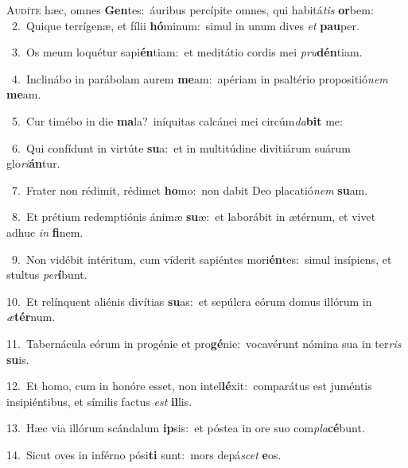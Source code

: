 \lettrine{\initial\textcolor{\initialcolor}{A}}{udíte} hæc, omnes \textbf{Gen}\-tes:~\star áuribus percípite omnes, qui habitá\textit{tis} \textbf{or}\-bem:\\
{\numbfont\textcolor{\numbcolor}{~2.}}~Quique terrígenæ, et fílii \textbf{hó}\-minum:~\star simul in unum dives \textit{et} \textbf{pau}\-per.\par
{\numbfont\textcolor{\numbcolor}{~3.}}~Os meum loquétur sapi\-\textbf{én}\-tiam:~\star et meditátio cordis mei \textit{pru}\-\textbf{dén}tiam.\par
{\numbfont\textcolor{\numbcolor}{~4.}}~Inclinábo in parábolam aurem \textbf{me}\-am:~\star apériam in psaltério propositió\textit{nem} \textbf{me}\-am.\par
{\numbfont\textcolor{\numbcolor}{~5.}}~Cur timébo in die \textbf{ma}\-la?~\star iníquitas calcánei mei circúm\-\textit{da}\-\textbf{bit} me:\par
{\numbfont\textcolor{\numbcolor}{~6.}}~Qui confídunt in virtúte \textbf{su}\-a:~\star et in multitúdine divitiárum suárum glo\-\textit{ri}\-\textbf{án}tur.\par
{\numbfont\textcolor{\numbcolor}{~7.}}~Frater non rédimit, rédimet \textbf{ho}\-mo:~\star non dabit Deo placatió\textit{nem} \textbf{su}\-am.\par
{\numbfont\textcolor{\numbcolor}{~8.}}~Et prétium redemptiónis ánimæ \textbf{su}\-æ:~\star et laborábit in ætérnum, et vivet adhuc \textit{in} \textbf{fi}\-nem.\par
{\numbfont\textcolor{\numbcolor}{~9.}}~Non vidébit intéritum, cum víderit sapiéntes mori\-\textbf{én}\-tes:~\star simul insípiens, et stultus \textit{per}\-\textbf{í}bunt.\par
{\numbfont\textcolor{\numbcolor}{10.}}~Et relínquent aliénis divítias \textbf{su}\-as:~\star et sepúlcra eórum domus illórum in \textit{æ}\-\textbf{tér}num.\par
{\numbfont\textcolor{\numbcolor}{11.}}~Tabernácula eórum in progénie et pro\-\textbf{gé}\-nie:~\star vocavérunt nómina sua in ter\textit{ris} \textbf{su}\-is.\par
{\numbfont\textcolor{\numbcolor}{12.}}~Et homo, cum in honóre esset, non intel\-\textbf{lé}\-xit:~\star comparátus est juméntis insipiéntibus, et símilis factus \textit{est} \textbf{il}\-lis.\par
{\numbfont\textcolor{\numbcolor}{13.}}~Hæc via illórum scándalum \textbf{ip}\-sis:~\star et póstea in ore suo com\-\textit{pla}\-\textbf{cé}bunt.\par
{\numbfont\textcolor{\numbcolor}{14.}}~Sicut oves in inférno pósi\textbf{ti} sunt:~\star mors depá\textit{scet} \textbf{e}\-os.\par
